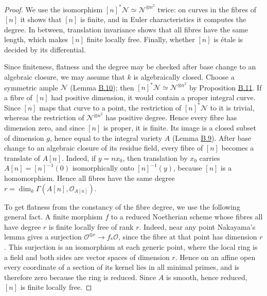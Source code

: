 \documentclass[11pt]{article}
\begin{document}
\begin{proof}[{Proof}]\label{bp35}%
We use the isomorphism \([n]^*\mathcal N\simeq\mathcal N^{\otimes n^2}\) twice: on curves in the fibres of \([n]\) it shows that \([n]\) is finite, and in Euler characteristics it computes the degree. In between, translation invariance shows that all fibres have the same length, which makes \([n]\) finite locally free. Finally, whether \([n]\) is étale is decided by its differential.

Since finiteness, flatness and the degree may be checked after base change to an algebraic closure, we may assume that \(k\) is algebraically closed. Choose a symmetric ample \(\mathcal N\) (Lemma \hyperref[bp29]{B.10}); then \([n]^*\mathcal N\simeq\mathcal N^{\otimes n^2}\) by Proposition \hyperref[bp31]{B.11}. If a fibre of \([n]\) had positive dimension, it would contain a proper integral curve. Since \([n]\) maps that curve to a point, the restriction of \([n]^*\mathcal N\) to it is trivial, whereas the restriction of \(\mathcal N^{\otimes n^2}\) has positive degree. Hence every fibre has dimension zero, and since \([n]\) is proper, it is finite. Its image is a closed subset of dimension \(g\), hence equal to the integral variety \(A\) (Lemma \hyperref[bp26]{B.9}). After base change to an algebraic closure of its residue field, every fibre of \([n]\) becomes a translate of \(A[n]\). Indeed, if \(y=nx_0\), then translation by \(x_0\) carries \(A[n]=[n]^{-1}(0)\) isomorphically onto \([n]^{-1}(y)\), because \([n]\) is a homomorphism. Hence all fibres have the same degree \(r=\dim_k\Gamma(A[n],\mathcal O_{A[n]})\).

To get flatness from the constancy of the fibre degree, we use the following general fact. A finite morphism \(f\) to a reduced Noetherian scheme whose fibres all have degree \(r\) is finite locally free of rank \(r\). Indeed, near any point Nakayama's lemma gives a surjection \(\mathcal O^{\oplus r}\to f_*\mathcal O\), since the fibre at that point has dimension \(r\). This surjection is an isomorphism at each generic point, where the local ring is a field and both sides are vector spaces of dimension \(r\). Hence on an affine open every coordinate of a section of its kernel lies in all minimal primes, and is therefore zero because the ring is reduced. Since \(A\) is smooth, hence reduced, \([n]\) is finite locally free.


\end{proof}
\end{document}
